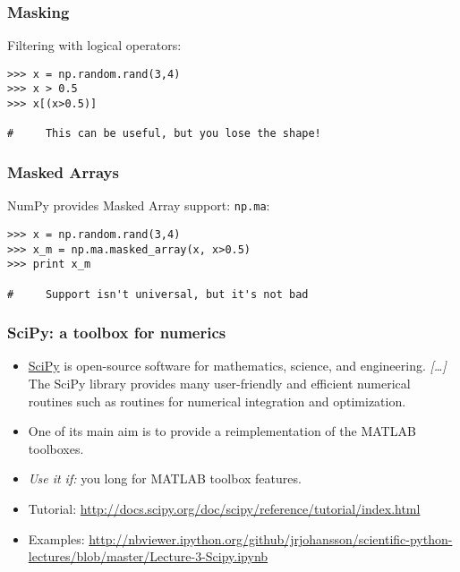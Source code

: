 \begin{frame}[fragile]\frametitle{Masking}

    Filtering with logical operators:
    \begin{lstlisting}
>>> x = np.random.rand(3,4)
>>> x > 0.5
>>> x[(x>0.5)]

#     This can be useful, but you lose the shape!
    \end{lstlisting}
\end{frame}

\begin{frame}[fragile]\frametitle{Masked Arrays}

    NumPy provides Masked Array support: \lstinline|np.ma|:
    \begin{lstlisting}
>>> x = np.random.rand(3,4)
>>> x_m = np.ma.masked_array(x, x>0.5)
>>> print x_m

#     Support isn't universal, but it's not bad
    \end{lstlisting}
\end{frame}


\begin{frame}[fragile]\frametitle{SciPy: a toolbox for numerics}

 \begin{itemize}
\item    \href{http://www.scipy.org}{SciPy} is open-source software for
  mathematics, science, and engineering. \emph{[\ldots]} The SciPy
  library provides many user-friendly and efficient numerical routines
  such as routines for numerical integration and optimization.

\item    One of its main aim is to provide a reimplementation of the
  MATLAB toolboxes.

\item     \emph{Use it if:} you long for MATLAB toolbox features.


  \item Tutorial: {\scriptsize\url{http://docs.scipy.org/doc/scipy/reference/tutorial/index.html}}
  \item Examples: {\scriptsize\url{http://nbviewer.ipython.org/github/jrjohansson/scientific-python-lectures/blob/master/Lecture-3-Scipy.ipynb}}
  \end{itemize}
\end{frame}

